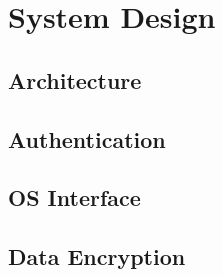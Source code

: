 \presec
\section{System Design} \postsec
\label{sec:sysdesign}

\presub
\subsection{Architecture} \postsub
\label{subsec:arch}

\presub
\subsection{Authentication} \postsub
\label{subsec:auth}

\presub
\subsection{OS Interface} \postsub
\label{subsec:inter}

\presub
\subsection{Data Encryption} \postsub
\label{subsec:encrypt}
